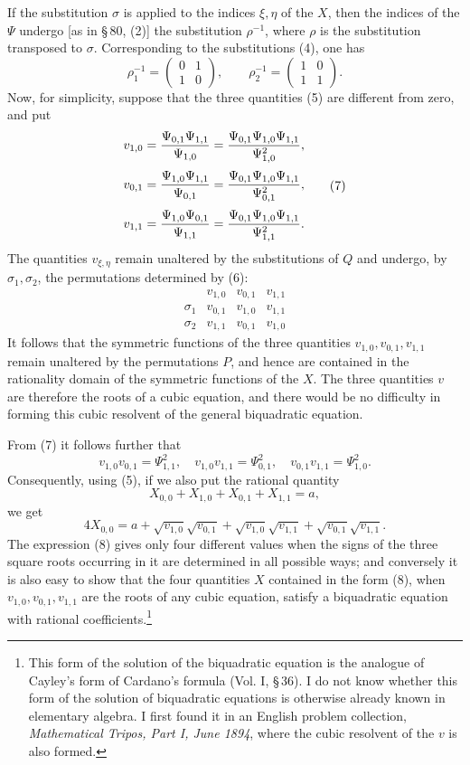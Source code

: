 \documentclass[11pt]{article}
\providecommand{\mat}[4]{\begin{pmatrix}#1&#2\\#3&#4\end{pmatrix}}
\providecommand{\mat}[4]{\begin{pmatrix}#1&#2\\#3&#4\end{pmatrix}}
\begin{document}
If the substitution $\sigma$ is applied to the indices $\xi,\eta$ of the $X$, then the indices of the $\Psi$ undergo [as in \S\,80, (2)] the substitution $\rho^{-1}$, where $\rho$ is the substitution transposed to $\sigma$. Corresponding to the substitutions (4), one has
\begin{equation}
 \rho_1^{-1}=\mat{0}{1}{1}{0},
 \qquad
 \rho_2^{-1}=\mat{1}{0}{1}{1}.
 \tag{6}
\end{equation}
Now, for simplicity, suppose that the three quantities (5) are different from zero, and put
\begin{equation}
\begin{aligned}
 v_{1,0}&={\Psi_{0,1}\Psi_{1,1}\over\Psi_{1,0}}={\Psi_{0,1}\Psi_{1,0}\Psi_{1,1}\over\Psi_{1,0}^2},\\[0.25em]
 v_{0,1}&={\Psi_{1,0}\Psi_{1,1}\over\Psi_{0,1}}={\Psi_{0,1}\Psi_{1,0}\Psi_{1,1}\over\Psi_{0,1}^2},\\[0.25em]
 v_{1,1}&={\Psi_{1,0}\Psi_{0,1}\over\Psi_{1,1}}={\Psi_{0,1}\Psi_{1,0}\Psi_{1,1}\over\Psi_{1,1}^2}.
\end{aligned}
\tag{7}
\end{equation}
The quantities $v_{\xi,\eta}$ remain unaltered by the substitutions of $Q$ and undergo, by $\sigma_1,\sigma_2$, the permutations determined by (6):
\[
\begin{array}{c|ccc}
&v_{1,0}&v_{0,1}&v_{1,1}\\
\sigma_1&v_{0,1}&v_{1,0}&v_{1,1}\\
\sigma_2&v_{1,1}&v_{0,1}&v_{1,0}
\end{array}
\]
It follows that the symmetric functions of the three quantities $v_{1,0},v_{0,1},v_{1,1}$ remain unaltered by the permutations $P$, and hence are contained in the rationality domain of the symmetric functions of the $X$. The three quantities $v$ are therefore the roots of a cubic equation, and there would be no difficulty in forming this cubic resolvent of the general biquadratic equation.

From (7) it follows further that
\[
 v_{1,0}v_{0,1}=\Psi_{1,1}^2,
 \quad v_{1,0}v_{1,1}=\Psi_{0,1}^2,
 \quad v_{0,1}v_{1,1}=\Psi_{1,0}^2.
\]
Consequently, using (5), if we also put the rational quantity
\[
 X_{0,0}+X_{1,0}+X_{0,1}+X_{1,1}=a,
\]
we get
\begin{equation}
 4X_{0,0}=a+\sqrt{v_{1,0}}\sqrt{v_{0,1}}
       +\sqrt{v_{1,0}}\sqrt{v_{1,1}}
       +\sqrt{v_{0,1}}\sqrt{v_{1,1}}.
 \tag{8}
\end{equation}
The expression (8) gives only four different values when the signs of the three square roots occurring in it are determined in all possible ways; and conversely it is also easy to show that the four quantities $X$ contained in the form (8), when $v_{1,0},v_{0,1},v_{1,1}$ are the roots of any cubic equation, satisfy a biquadratic equation with rational coefficients.\footnote{This form of the solution of the biquadratic equation is the analogue of Cayley's form of Cardano's formula (Vol. I, \S\,36). I do not know whether this form of the solution of biquadratic equations is otherwise already known in elementary algebra. I first found it in an English problem collection, \emph{Mathematical Tripos, Part I, June 1894}, where the cubic resolvent of the $v$ is also formed.}
\end{document}
